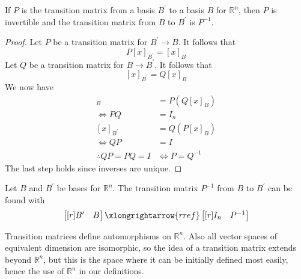 \begin{theorem}
    If \(P\) is the transition matrix from a basis \(B^{\prime} \) to a basis \(B\) for \(\mathbb{R} ^n\), then \(P\) is invertible and the transition matrix from \(B\) to \(B^{\prime} \) is \(P ^{-1} \).
\end{theorem}
\begin{proof}
    Let \(P\) be a transition matrix for \(B^{\prime} \to B\). It follows that
    \[
        P[x]_{B^{\prime} }=[x]_B
    \]
    Let \(Q\) be a transition matrix for \(B\to B^{\prime} \). It follows that
    \[
        [x]_{B^{\prime} }=Q[x]_B
    \]
    We now have
    \begin{align*}
        [x]_B &=P\left( Q[x]_B \right)\\
        \iff PQ&=I_n\\
        [x]_{B^{\prime}} &=Q\left( P[x]_B \right)\\
        \iff QP&=I\\
        \therefore QP=PQ=I&\iff P=Q^{-1} 
    \end{align*}
    The last step holds since inverses are unique.
\end{proof}
\begin{theorem}
    Let \(B\) and \(B^{\prime} \) be bases for \(\mathbb{R}^n\). The transition matrix \(P ^{-1} \) from \(B\) to \(B^{\prime} \) can be found with
    \[
        \begin{bmatrix}[r]
            B^{\prime}  &B   \\
        \end{bmatrix}\xlongrightarrow{rref} \begin{bmatrix}[r]
            I_n &P ^{-1}    \\
        \end{bmatrix}
    \]
\end{theorem}
\begin{remark}
    Transition matrices define automorphisms on \(\mathbb{R}^n\). Also all vector spaces of equivalent dimension are isomorphic, so the idea of a transition matrix extends beyond \(\mathbb{R} ^n\), but this is the space where it can be initially defined most easily, hence the use of \(\mathbb{R}^n\) in our definitions.
\end{remark}
